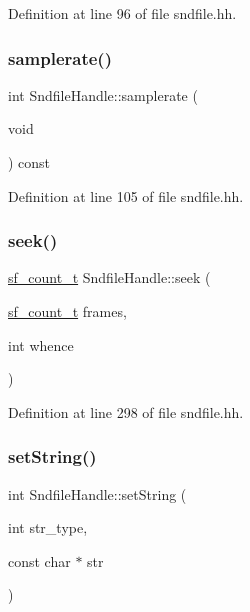 Definition at line 96 of file sndfile.\+hh.

\mbox{\label{class_sndfile_handle_aa4db003e80513fff2f861cc17d459911}} 
\subsubsection{\texorpdfstring{samplerate()}{samplerate()}}
{\footnotesize\ttfamily int Sndfile\+Handle\+::samplerate (\begin{DoxyParamCaption}\item[{void}]{ }\end{DoxyParamCaption}) const\hspace{0.3cm}{\ttfamily [inline]}}



Definition at line 105 of file sndfile.\+hh.

\mbox{\label{class_sndfile_handle_a0751c210cba5d0d757ce801381743ef3}} 
\subsubsection{\texorpdfstring{seek()}{seek()}}
{\footnotesize\ttfamily \mbox{\hyperlink{sndfile_8h_af2b12fded74bc949f1f1f392a2af4892}{sf\+\_\+count\+\_\+t}} Sndfile\+Handle\+::seek (\begin{DoxyParamCaption}\item[{\mbox{\hyperlink{sndfile_8h_af2b12fded74bc949f1f1f392a2af4892}{sf\+\_\+count\+\_\+t}}}]{frames,  }\item[{int}]{whence }\end{DoxyParamCaption})\hspace{0.3cm}{\ttfamily [inline]}}



Definition at line 298 of file sndfile.\+hh.

\mbox{\label{class_sndfile_handle_a6fa21cda95c6016c9f2f133d2e94da8b}} 
\subsubsection{\texorpdfstring{setString()}{setString()}}
{\footnotesize\ttfamily int Sndfile\+Handle\+::set\+String (\begin{DoxyParamCaption}\item[{int}]{str\+\_\+type,  }\item[{const char $\ast$}]{str }\end{DoxyParamCaption})\hspace{0.3cm}{\ttfamily [inline]}}



